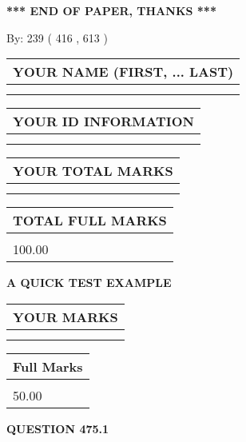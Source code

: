 \documentclass[12pt]{article}
\begin{document}
\vspace{1.0in} 
{\textbf{\large{ *** END OF PAPER, THANKS *** }}} 
   
   
\hspace{1.0in} By: 
 239 ( 416 ,  613 )
   
   
   
   
\newpage 
\setcounter{page}{ 
   475001 } 
   
   
   
   
\noindent\begin{tabular}{|l|}
\hline
YOUR NAME (FIRST, ... LAST)  \\
\hline
 \\ 
 \\ 
\hline
\end{tabular}
\hspace{0.05in} \begin{tabular}{|l|}
\hline
 YOUR   ID   INFORMATION  \\
\hline
 \\ 
 \\ 
\hline
\end{tabular}
   
   
\vspace{0.2in}\noindent\begin{tabular}{|l|}
\hline
YOUR TOTAL MARKS  \\
\hline
 \\ 
 \\ 
\hline
\end{tabular}
\hspace{0.05in} \begin{tabular}{|l|}
\hline
TOTAL FULL MARKS  \\
\hline
 \\ 
100.00 \\
\hline
\end{tabular}
   
   
 \vspace{0.2in}
{\LARGE {\textbf{ A QUICK TEST EXAMPLE}}}
   
   
  
\vspace{0.2in}
  
\noindent\begin{tabular}{|l|}
\hline
 YOUR MARKS  \\
\hline
 \\ 
 \\ 
\hline
\end{tabular}
\hspace{0.05in} \begin{tabular}{|l|}
\hline
 Full Marks  \\
\hline
 \\ 
50.00 \\
\hline
\end{tabular}
{\textbf{\Large{QUESTION
475.1 
}}}
  
\end{document}
